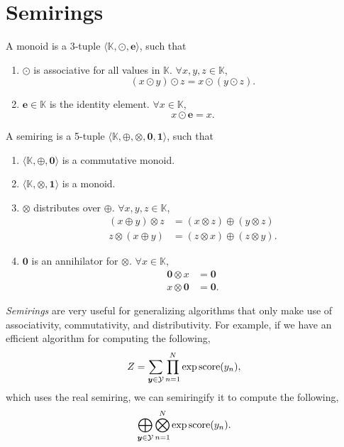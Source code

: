 \section{Semirings} \label{sec:semirings}

\begin{definition}[Monoid]
  A monoid is a 3-tuple $\langle \mathbb{K},\odot,\bm{e} \rangle$, such that
  \begin{enumerate}
    \item $\odot$ is associative for all values in $\mathbb{K}$. $\forall x,y,z
      \in \mathbb{K}$, \[
        (x\odot y)\odot z = x\odot (y\odot z)
      .\]
  \item $\bm{e}\in \mathbb{K}$ is the identity element. $\forall x \in
    \mathbb{K}$, \[
        x \odot \bm{e} = x
      .\] 
  \end{enumerate}
\end{definition}

\begin{definition}[Semiring]
  A semiring is a 5-tuple $\langle \mathbb{K},\oplus,\otimes,\bm{0},\bm{1}
  \rangle$, such that
  \begin{enumerate}
    \item $\langle \mathbb{K},\oplus,\bm{0} \rangle$ is a commutative monoid.
    \item $\langle \mathbb{K},\otimes,\bm{1} \rangle$ is a monoid.
    \item $\otimes$ distributes over $\oplus$. $\forall x,y,z\in \mathbb{K}$,
      \begin{align*}
        (x\oplus y) \otimes z &= (x\otimes z) \oplus (y \otimes z) \\
        z\otimes (x \oplus y) &= (z\otimes x) \oplus (z\otimes y)
      .\end{align*}
    \item $\bm{0}$ is an annihilator for $\otimes$. $\forall x \in \mathbb{K}$,
      \begin{align*}
        \bm{0} \otimes x &= \bm{0} \\
        x \otimes \bm{0} &= \bm{0}
      .\end{align*}
  \end{enumerate}
\end{definition}

\textit{Semirings} are very useful for generalizing algorithms that only make use of
associativity, commutativity, and distributivity. For example, if we have an
efficient algorithm for computing the following, \[
  Z = \sum_{\bm{y}\in\mathcal{Y}} \prod_{n=1}^N \exp \mathrm{score}(y_n)
,\]
which uses the real semiring, we can semiringify it to compute the following,
\[
  \bigoplus_{\bm{y}\in\mathcal{Y}} \bigotimes_{n=1}^N \exp \mathrm{score}(y_n)
.\]

